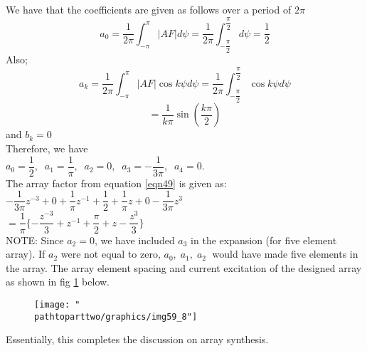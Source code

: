 \begin{exmp}
We have that the coefficients are given as follows over a period of $2\pi$
$$a_0 = \dfrac{1}{2\pi}\int_{-\pi}^{\pi}|AF|d\psi = \dfrac{1}{2\pi}\int_{-\dfrac{\pi}{2}}^{\dfrac{\pi}{2}}d\psi = \frac{1}{2}$$
Also;
$$a_k = \dfrac{1}{2\pi}\int_{-\pi}^{\pi}|AF|\cos k\psi d\psi = \dfrac{1}{2\pi}\int_{-\dfrac{\pi}{2}}^{\dfrac{\pi}{2}}\cos k\psi d\psi$$
$$= \dfrac{1}{k\pi}\sin(\dfrac{k\pi}{2})$$ and $b_k = 0$\\
Therefore, we have\\
$ a_0 = \dfrac{1}{2}, \; \; a_1 = \dfrac{1}{\pi},\; \; a_2 = 0, \; \; a_3 = -\dfrac{1}{3\pi}, \; \;a_4 = 0$.\\
The array factor from equation \ref{eqn49} is given as:\\
$-\dfrac{1}{3\pi}z^{-3} + 0 +\dfrac{1}{\pi}z^{-1} + \dfrac{1}{2} + \dfrac{1}{\pi}z + 0 - \dfrac{1}{3\pi}z^{3}$\\
$= \dfrac{1}{\pi}\{
-\dfrac{z^{-3}}{3} + z^{-1} + \dfrac{\pi}{2} + z - \dfrac{z^3}{3}
\}$\\
NOTE: Since $a_2 = 0$, we have included $a_3$ in the expansion (for five element array). If $a_2$ were not equal to zero, $a_0, \; a_1, \; a_2 \;$ would have made five elements in the array. The array element spacing and current excitation of the designed array as shown in fig \ref{fig:fig-7} below.
\begin{figure}[h]
\centering
\texttt{[image: "\\pathtoparttwo/graphics/img59\_8"]}
\caption{}
\label{fig:fig-7}
\end{figure}

\end{exmp}
\begin{ExerciseList}
\Exercise[title=DIY]
\end{ExerciseList}

Essentially, this completes the discussion on array synthesis.